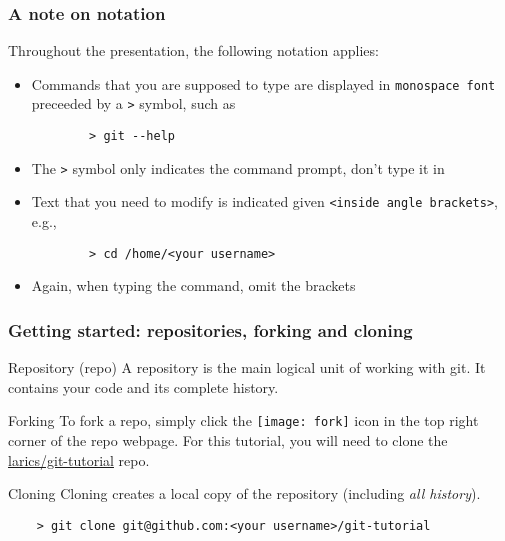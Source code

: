 
\begin{frame}[fragile]
	\frametitle{A note on notation}
	
	Throughout the presentation, the following notation applies:
	\begin{itemize}
		\item Commands that you are supposed to type are displayed in \texttt{monospace font} preceeded by a \texttt{>} symbol, such as
		\begin{verbatim}
		> git --help
		\end{verbatim}
		\item The \texttt{>} symbol only indicates the command prompt, don't type it in
		\item Text that you need to modify is indicated given \texttt{<inside angle brackets>}, e.g.,
		\begin{verbatim}
		> cd /home/<your username>
		\end{verbatim}
		\item Again, when typing the command, omit the brackets
	\end{itemize}
\end{frame}


\begin{frame}[fragile]
	\frametitle{Getting started: repositories, forking and cloning}

	\begin{block}{Repository (repo)}
	A repository is the main logical unit of working with git. It contains your code and its complete history. 
	\end{block}

	\begin{block}{Forking}
	To fork a repo, simply click the \texttt{[image: fork]} icon in the top right corner of the repo webpage. For this tutorial, you will need to clone the \href{https://github.com/larics/git-tutorial}{larics/git-tutorial} repo.
	\end{block}

	\begin{block}{Cloning}
	Cloning creates a local copy of the repository (including \emph{all history}).	
	\begin{verbatim}
	> git clone git@github.com:<your username>/git-tutorial
	\end{verbatim}
	\end{block}
\end{frame}
	
